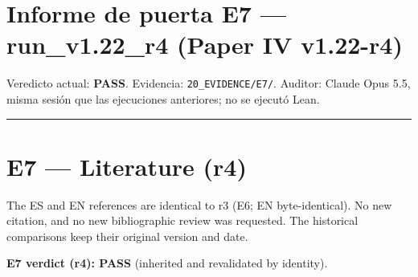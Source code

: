 \documentclass[
]{article}
\author{}
\date{}
\begin{document}
\section{Informe de puerta E7 --- run\_v1.22\_r4 (Paper IV
v1.22-r4)}\label{informe-de-puerta-e7--run_v122_r4-paper-iv-v122-r4}

Veredicto actual: \textbf{PASS}. Evidencia: \texttt{20\_EVIDENCE/E7/}.
Auditor: Claude Opus 5.5, misma sesión que las ejecuciones anteriores;
no se ejecutó Lean.

\begin{center}\rule{0.5\linewidth}{0.5pt}\end{center}

\section{E7 --- Literature (r4)}\label{e7--literature-r4}

The ES and EN references are identical to r3 (E6; EN byte-identical). No
new citation, and no new bibliographic review was requested. The
historical comparisons keep their original version and date.

\textbf{E7 verdict (r4): PASS} (inherited and revalidated by identity).
\end{document}
